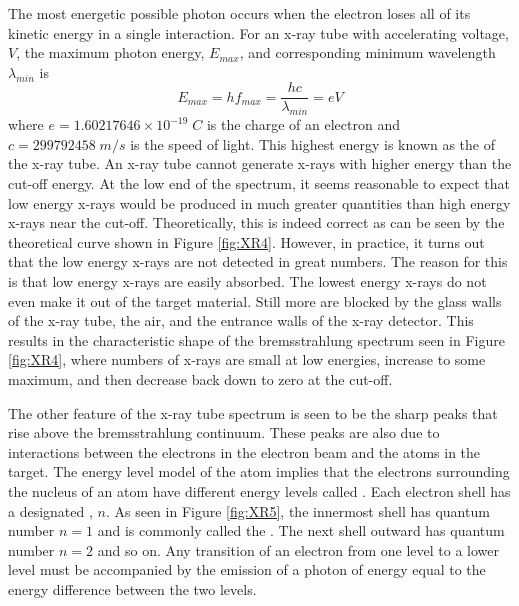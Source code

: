 \noindent The most energetic possible photon occurs when the electron loses all of its kinetic energy in a single interaction. For an x-ray tube with accelerating voltage, $V$, the maximum photon energy, $E_{max}$, and corresponding minimum wavelength $\lambda_{min}$ is \begin{equation}\label{eq:XR2}
    E_{max} = hf_{max} = \frac{hc}{\lambda_{min}} = eV
\end{equation}
where $e = 1.60217646\times 10^{-19}\;C$ is the charge of an electron and $c = 299792458\;m/s$ is the speed of light. This highest energy is known as the  of the x-ray tube. An x-ray tube cannot generate x-rays with higher energy than the cut-off energy. At the low end of the spectrum, it seems reasonable to expect that low energy x-rays would be produced in much greater quantities than high energy x-rays near the cut-off. Theoretically, this is indeed correct as can be seen by the theoretical curve shown in Figure \ref{fig:XR4}. However, in practice, it turns out that the low energy x-rays are not detected in great numbers. The reason for this is that low energy x-rays are easily absorbed. The lowest energy x-rays do not even make it out of the target material. Still more are blocked by the glass walls of the x-ray tube, the air, and the entrance walls of the x-ray detector. This results in the characteristic shape of the bremsstrahlung spectrum seen in Figure \ref{fig:XR4}, where numbers of x-rays are small at low energies, increase to some maximum, and then decrease back down to zero at the cut-off. 

\noindent The other feature of the x-ray tube spectrum is seen to be the sharp peaks that rise above the bremsstrahlung continuum. These peaks are also due to interactions between the electrons in the electron beam and the atoms in the target. The energy level model of the atom implies that the electrons surrounding the nucleus of an atom have different energy levels called . Each electron shell has a designated , $n$. As seen in Figure \ref{fig:XR5}, the innermost shell has quantum number $n=1$ and is commonly called the . The next shell outward has quantum number $n=2$ and so on. Any transition of an electron from one level to a lower level must be accompanied by the emission of a photon of energy equal to the energy difference between the two levels.

